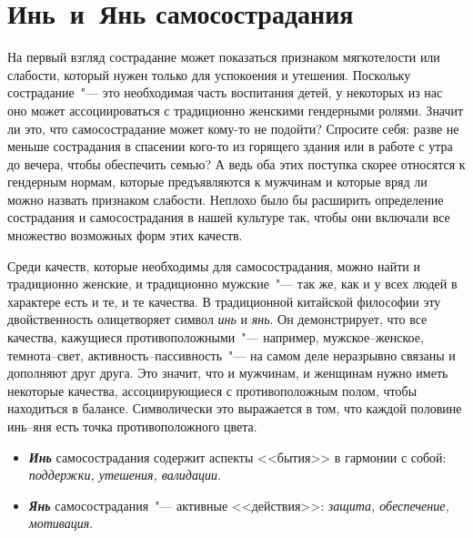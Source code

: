 
\chapter{Инь~и~Янь самосострадания} \label{The_Yin_and_Yang_of_Self-Compassion}

На первый взгляд сострадание может показаться признаком мягкотелости или слабости, который нужен только для успокоения и утешения. Поскольку сострадание~"--- это необходимая часть воспитания детей, у некоторых из нас оно может ассоциироваться с традиционно женскими гендерными ролями\cite{55}. Значит ли это, что самосострадание может кому-то не подойти?
Спросите себя: разве не меньше сострадания в спасении кого-то из горящего здания или в работе с утра до вечера, чтобы обеспечить семью? А ведь оба этих поступка скорее относятся к гендерным нормам, которые предъявляются к мужчинам и которые вряд ли можно назвать признаком слабости. Неплохо было бы расширить определение сострадания и самосострадания в нашей культуре так, чтобы они включали все множество возможных форм этих качеств.

Среди качеств, которые необходимы для самосострадания, можно найти и традиционно женские, и традиционно мужские~"--- так же, как и у всех людей в характере есть и те, и те качества. В традиционной китайской философии эту двойственность олицетворяет символ \textit{инь} и \textit{янь}. Он демонстрирует, что все качества, кажущиеся противоположными~"--- например, мужское--женское, темнота--свет, активность--пассивность~"--- на самом деле неразрывно связаны и дополняют друг друга. Это значит, что и мужчинам, и женщинам нужно иметь некоторые качества, ассоциирующиеся с противоположным полом, чтобы находиться в балансе. Символически это выражается в том, что каждой половине инь--яня есть точка противоположного цвета. 

\vspace{3ex}

\begin{center}
	{\Huge\Yinyang}
\end{center}

\vspace{1ex}

\begin{itemize}
	\item \textbf{\textit{Инь}} самосострадания содержит аспекты <<бытия>> в гармонии с собой: \textit{поддержки, утешения, валидации}.
	\item \textbf{\textit{Янь}} самосострадания~"--- активные <<действия>>: \textit{защита, обеспечение, мотивация}.
\end{itemize}

